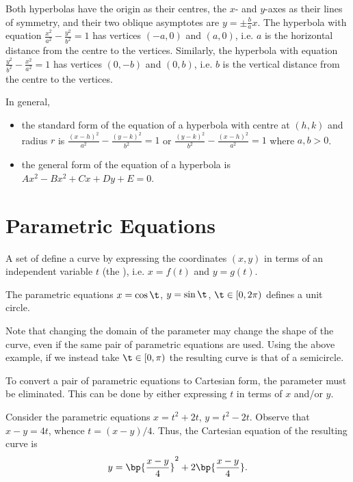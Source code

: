 Both hyperbolas have the origin as their centres, the $x$- and $y$-axes as their lines of symmetry, and their two oblique asymptotes are $y = \pm \frac{b}{a} x$. The hyperbola with equation $\frac{x^2}{a^2} - \frac{y^2}{b^2} = 1$ has vertices $(-a, 0)$ and $(a, 0)$, i.e. $a$ is the horizontal distance from the centre to the vertices. Similarly, the hyperbola with equation $\frac{y^2}{b^2} - \frac{x^2}{a^2} = 1$ has vertices $(0, -b)$ and $(0, b)$, i.e. $b$ is the vertical distance from the centre to the vertices.

In general,
\begin{itemize}
    \item the standard form of the equation of a hyperbola with centre at $(h, k)$ and radius $r$ is $\frac{(x-h)^2}{a^2} - \frac{(y-k)^2}{b^2} = 1$ or $\frac{(y-k)^2}{b^2} - \frac{(x-h)^2}{a^2} = 1$ where $a, b > 0$.
    \item the general form of the equation of a hyperbola is $Ax^2 - Bx^2 + Cx + Dy + E = 0$.
\end{itemize}

\section{Parametric Equations}

\begin{definition}
    A set of  define a curve by expressing the coordinates $(x, y)$ in terms of an independent variable $t$ (the ), i.e. $x = f(t)$ and $y = g(t)$.
\end{definition}

\begin{example}
    The parametric equations $x = \cos \t$, $y = \sin \t$, $\t \in [0, 2\pi)$ defines a unit circle.
\end{example}

Note that changing the domain of the parameter may change the shape of the curve, even if the same pair of parametric equations are used. Using the above example, if we instead take $\t \in [0, \pi)$ the resulting curve is that of a semicircle.

To convert a pair of parametric equations to Cartesian form, the parameter must be eliminated. This can be done by either expressing $t$ in terms of $x$ and/or $y$.

\begin{example}
    Consider the parametric equations $x = t^2 + 2t$, $y = t^2 - 2t$. Observe that $x - y = 4t$, whence $t = (x-y)/4$. Thus, the Cartesian equation of the resulting curve is \[y = \bp{\frac{x-y}4}^2 + 2\bp{\frac{x-y}4}.\]
\end{example}

